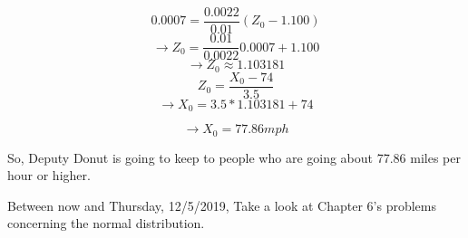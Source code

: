 \documentclass[]{article}
\begin{document}
		$$0.0007 = \dfrac{0.0022}{0.01}(Z_0 -1.100)$$
		$$\to Z_0 = \dfrac{0.01}{0.0022}0.0007 + 1.100$$
		$$\to Z_0 \approx 1.103181$$
		$$Z_0 = \dfrac{X_0 - 74}{3.5}$$
		$$\to X_0 = 3.5 * 1.103181 + 74$$
		
		$$\to X_0 = 77.86mph$$
		
		So, Deputy Donut is going to keep to people who are going about 77.86 miles per hour or higher.
		
		Between now and Thursday, 12/5/2019, Take a look at Chapter 6's problems concerning the normal distribution.
\end{document}
